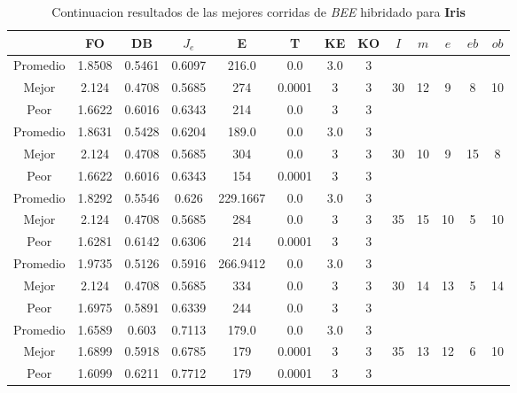 \begin{table}[h!]
    \footnotesize
    \begin{center}
        \begin{tabular}{|c|c|c|c|c|c|c|c|c|c|c|c|c|}
        \hline
            & {\bf FO} & {\bf DB} & $J_e$ & {\bf E} & {\bf T} & {\bf KE} & {\bf KO} & $I$ & $m$ & $e$ & $eb$ & $ob$ \\
        \hline
        \hline
            Promedio  & 1.8508 & 0.5461 & 0.6097 & 216.0 & 0.0 & 3.0 & 3 &  &  &  &  & \\
            \cline{1-8}
            Mejor & 2.124 & 0.4708  & 0.5685 & 274 & 0.0001 & 3 & 3 & 30 & 12 & 9 & 8 & 10\\
            \cline{1-8}
            Peor & 1.6622 & 0.6016  & 0.6343 & 214 & 0.0 & 3 & 3 &  &  &  &  & \\
        \hline
        \hline
            Promedio  & 1.8631 & 0.5428 & 0.6204 & 189.0 & 0.0 & 3.0 & 3 &  &  &  &  & \\
            \cline{1-8}
            Mejor & 2.124 & 0.4708  & 0.5685 & 304 & 0.0 & 3 & 3 & 30 & 10 & 9 & 15 & 8\\
            \cline{1-8}
            Peor & 1.6622 & 0.6016  & 0.6343 & 154 & 0.0001 & 3 & 3 &  &  &  &  & \\
        \hline
        \hline
            Promedio  & 1.8292 & 0.5546 & 0.626 & 229.1667 & 0.0 & 3.0 & 3 &  &  &  &  & \\
            \cline{1-8}
            Mejor & 2.124 & 0.4708  & 0.5685 & 284 & 0.0 & 3 & 3 & 35 & 15 & 10 & 5 & 10\\
            \cline{1-8}
            Peor & 1.6281 & 0.6142  & 0.6306 & 214 & 0.0001 & 3 & 3 &  &  &  &  & \\
        \hline
        \hline
            Promedio  & 1.9735 & 0.5126 & 0.5916 & 266.9412 & 0.0 & 3.0 & 3 &  &  &  &  & \\
            \cline{1-8}
            Mejor & 2.124 & 0.4708  & 0.5685 & 334 & 0.0 & 3 & 3 & 30 & 14 & 13 & 5 & 14\\
            \cline{1-8}
            Peor & 1.6975 & 0.5891  & 0.6339 & 244 & 0.0 & 3 & 3 &  &  &  &  & \\
        \hline
        \hline
            Promedio  & 1.6589 & 0.603 & 0.7113 & 179.0 & 0.0 & 3.0 & 3 &  &  &  &  & \\
            \cline{1-8}
            Mejor & 1.6899 & 0.5918  & 0.6785 & 179 & 0.0001 & 3 & 3 & 35 & 13 & 12 & 6 & 10\\
            \cline{1-8}
            Peor & 1.6099 & 0.6211  & 0.7712 & 179 & 0.0001 & 3 & 3 &  &  &  &  & \\
        \hline
        \end{tabular}
        \caption{Continuacion resultados de las mejores corridas de \emph{BEE} hibridado para {\bf Iris}}
        \label{tb:tablebeehibcsv}
    \end{center}
\end{table}
